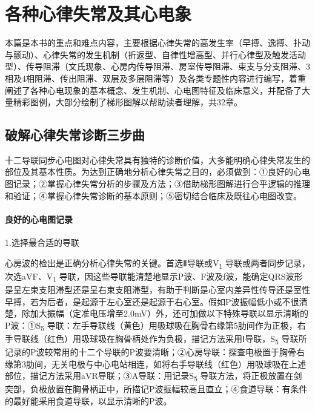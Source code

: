 \part{各种心律失常及其心电象}

本篇是本书的重点和难点内容，主要根据心律失常的高发生率（早搏、逸搏、扑动与颤动）、心律失常的发生机制（折返型、自律性增高型、并行心律型及触发活动型）、传导阻滞（文氏现象、心房内传导阻滞、房室传导阻滞、束支与分支阻滞、3相及4相阻滞、传出阻滞、双层及多层阻滞等）及各类专题性内容进行编写，着重阐述了各种心电现象的基本概念、发生机制、心电图特征及临床意义，并配备了大量精彩图例，大部分绘制了梯形图解以帮助读者理解，共32章。

\protect\hypertarget{text00016.html}{}{}

\protect\hypertarget{text00016.htmlux5cux23chapter16}{}{}

\chapter{破解心律失常诊断三步曲}

十二导联同步心电图对心律失常具有独特的诊断价值，大多能明确心律失常发生的部位及其基本性质。为达到正确地分析心律失常之目的，必须做到：①良好的心电图记录；②掌握心律失常分析的步骤及方法；③借助梯形图解进行合乎逻辑的推理和验证；④掌握心律失常诊断的基本原则；⑤密切结合临床及既往心电图改变。

\protect\hypertarget{text00016.htmlux5cux23subid116}{}{}

\subsection{良好的心电图记录}

1.选择最合适的导联

心房波的检出是正确分析心律失常的关键。首选Ⅱ导联或V\textsubscript{1}
导联或两者同步记录，次选aVF、V\textsubscript{1}
导联，因这些导联能清楚地显示P波、F波及f波，能确定QRS波形是呈左束支阻滞型还是呈右束支阻滞型，有助于判断是心室内差异性传导还是室性早搏，若为后者，是起源于左心室还是起源于右心室。假如P波振幅低小或不很清楚，除加大振幅（定准电压增至2.0mV）外，还可加做以下特殊导联以显示清晰的P波：①S\textsubscript{5}
导联：左手导联线（黄色）用吸球吸在胸骨右缘第5肋间作为正极，右手导联线（红色）用吸球吸在胸骨柄处作为负极，描记方法采用Ⅰ导联，S\textsubscript{5}
导联所记录的P波较常用的十二个导联的P波要清晰；②心房导联：探查电极置于胸骨右缘第3肋间，无关电极与中心电站相连，如将右手导联线（红色）用吸球吸在上述部位，描记方法采用aVR导联；③A导联：用记录S\textsubscript{5}
导联方法，将正极放置在剑突部，负极放置在胸骨柄正中，所描记P波振幅较高且直立；④食道导联：有条件的最好能采用食道导联，以显示清晰的P波。

